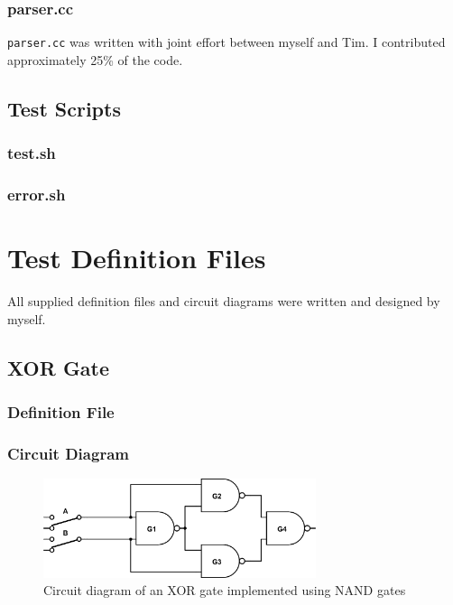 \documentclass[a4paper,10pt]{article}
\begin{document}
\subsubsection{parser.cc}


\texttt{parser.cc} was written with joint effort between myself and Tim. I contributed approximately 25\% of the code.

\subsection{Test Scripts}
\label{sec:tests}
\subsubsection{test.sh}

\subsubsection{error.sh}

\pagebreak

\section{Test Definition Files}
\label{sec:examples}

All supplied definition files and circuit diagrams were written and designed by myself.

\subsection{XOR Gate}

\subsubsection{Definition File}


\subsubsection{Circuit Diagram}
\begin{figure}[h]
 \centering
 \includegraphics[width=8cm]{../../examples/xor.png}
 \caption{Circuit diagram of an XOR gate implemented using NAND gates}
 \label{fig:example-xor}
\end{figure}
\end{document}
